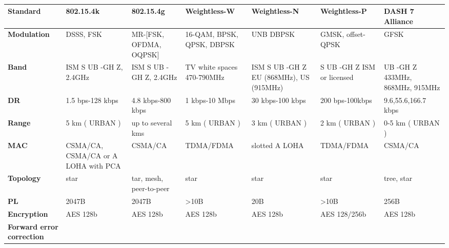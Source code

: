 \begin{table}[h!]
\scriptsize
	\begin{tabulary}{\textwidth}{L|L|L|L|L|L|L}
	\textbf{Standard}                & \textbf{802.15.4k}                  & \textbf{802.15.4g}      & \textbf{Weightless-W}      & \textbf{Weightless-N}                   & \textbf{Weightless-P}      & \textbf{DASH 7 Alliance}\\\hline
	\textbf{Modulation}              & DSSS, FSK                           & MR-[FSK, OFDMA, OQPSK]  & 16-QAM, BPSK, QPSK, DBPSK  & UNB DBPSK                               & GMSK, offset-QPSK          & GFSK\\\hline
	\textbf{Band}                    & ISM S UB -GH Z, 2.4GHz              & ISM S UB -GH Z, 2.4GHz  & TV white spaces 470-790MHz & ISM S UB -GH Z EU (868MHz), US (915MHz) & S UB -GH Z ISM or licensed & UB -GH Z 433MHz, 868MHz, 915MHz\\\hline
	\textbf{\ac{DR}}                 & 1.5 bps-128 kbps                    & 4.8 kbps-800 kbps       & 1 kbps-10 Mbps             & 30 kbps-100 kbps                        & 200 bps-100kbps            & 9.6,55.6,166.7 kbps\\\hline
	\textbf{Range}                   & 5 km ( URBAN )                      & up to several kms       & 5 km ( URBAN )             & 3 km ( URBAN )                          & 2 km ( URBAN )             & 0-5 km ( URBAN )\\\hline
	\textbf{MAC}                     & CSMA/CA, CSMA/CA or A LOHA with PCA & CSMA/CA                 & TDMA/FDMA                  & slotted A LOHA                          & TDMA/FDMA                  & CSMA/CA \\\hline
	\textbf{Topology}                & star                                & tar, mesh, peer-to-peer & star                       & star                                    & star                       & tree, star\\\hline
	\textbf{\ac{PL}}                 & 2047B                               & 2047B                   & >10B                       & 20B                                     & >10B                       & 256B \\\hline
	\textbf{Encryption}              & AES 128b                            & AES 128b                & AES 128b                   & AES 128b                                & AES 128/256b               & AES 128b \\\hline
	\textbf{Forward error correction}& \ok                                 & \ok                     & \ok                        & \ko                                     & \ok                        & \ok\\\hline
	\end{tabulary}
\caption{\label{tab:uyuy} \cite{raza_low_22}}
\end{table}

